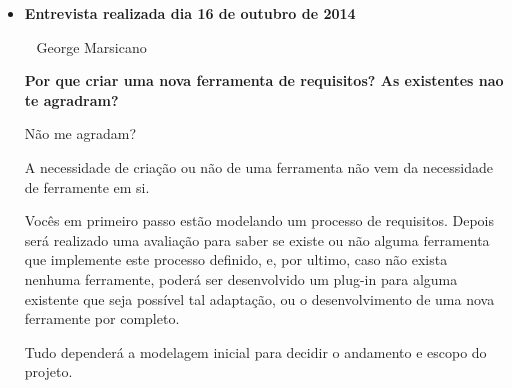 
\begin{itemize}
	\item \textbf{Entrevista realizada dia 16 de outubro de 2014}

		\cliente~ George Marsicano

		\textbf{Por que criar uma nova ferramenta de requisitos? As existentes nao te agradram?}
	
		Não me agradam?

		A necessidade de criação ou não de uma ferramenta não vem da necessidade de ferramente em si.
		
		Vocês em primeiro passo estão modelando um processo de requisitos. Depois será realizado uma avaliação para saber se existe ou não alguma ferramenta que implemente este processo definido, e, por ultimo, caso não exista nenhuma ferramente, poderá ser desenvolvido um plug-in para alguma existente que seja possível tal adaptação, ou o desenvolvimento de uma nova ferramente por completo.

		Tudo dependerá a modelagem inicial para decidir o andamento e escopo do projeto.
\end{itemize}